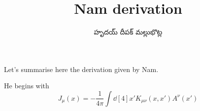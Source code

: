\documentclass[../main.tex]{subfiles}
\title{Nam derivation}
\author{\begin{telugu}హృదయ్ దీపక్ మల్లుభొట్ల\end{telugu}}
\date{}
\begin{document}
	\onlyinsubfile{\maketitle}

	Let's summarise here the derivation given by Nam\supercite{Nam1967}.

	He begins with
	\begin{equation}
		J_\mu(x) = - \frac{1}{4\pi}\int \dd[4]{x'} K_{\mu\nu}(x, x') A^\nu(x')
	\end{equation}
\end{document}

